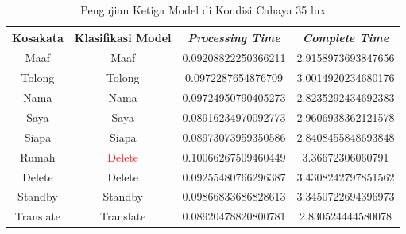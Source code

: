 \begin{longtable}{|c|c|c|c|}
  \caption{Pengujian Ketiga Model di Kondisi Cahaya 35 lux}
  \label{tb:prediksigelap3}                                   \\
  \hline
  \rowcolor[HTML]{C0C0C0}
  \textbf{Kosakata} & \textbf{Klasifikasi Model} & \textbf{\emph{Processing Time}} & \textbf{\emph{Complete Time}}\\
  \hline
  Maaf              & Maaf                        & 0.09208822250366211                           & 2.9158973693847656                                  \\
  Tolong            & Tolong                        & 0.0972287654876709                           & 3.0014920234680176                                  \\
  Nama              & Nama                        & 0.09724950790405273                           & 2.8235292434692383                                  \\
  Saya              & Saya                        & 0.08916234970092773                           & 2.9606938362121578                                  \\
  Siapa              & Siapa                        & 0.08973073959350586                           & 2.8408455848693848                                  \\
  Rumah             & \textcolor{red}{Delete}                        & 0.10066267509460449                           & 3.36672306060791                                  \\
  Delete            & Delete                        & 0.09255480766296387                           & 3.4308242797851562                                  \\
  Standby           & Standby                        & 0.09866833686828613                           & 3.3450722694396973                                  \\
  Translate         & Translate                        & 0.08920478820800781                           & 2.830524444580078                                  \\
  \hline
\end{longtable}

